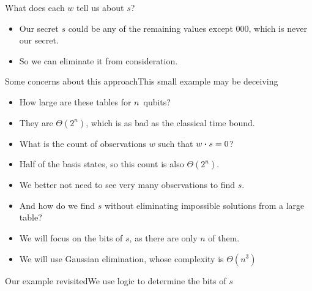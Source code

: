{\begin{frame}{What does each $w$ tell us about $s$?}
{{\begin{itemize}
\begin{itemize}
    \end{itemize}
    \item<8-> Our secret $s$ could be any of the remaining values except $000$, which is never our secret.
    \item<9-> So we can eliminate it from consideration.
\end{itemize}}%
}%
\end{frame}
}
\begin{frame}{Some concerns about this approach}{This small example may be deceiving}

\begin{itemize}[<+->]
    \item How large are these tables for $n$~qubits?
    \item They are $\Theta(2^n)$, which is as bad as the classical time bound.
    \item What is the count of observations $w$ such that $w\boldsymbol{\cdot}s=0$?
    \item Half of the basis states, so this count is also $\Theta(2^n)$.   
    \item We better not need to see very many observations to find $s$.
    \item And how do we find $s$ without eliminating impossible solutions from a large table?
    \item We will focus on the bits of $s$, as there are only $n$ of them.
    \item We will use Gaussian elimination, whose complexity is $\Theta(n^{3})$
\end{itemize}
    
\end{frame}

\begin{frame}{Our example revisited}{We use logic to determine the bits of $s$}

    
\end{frame}